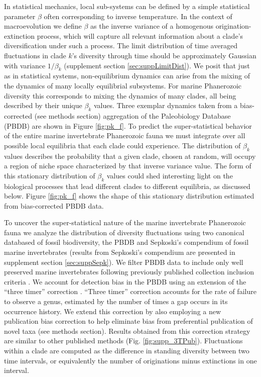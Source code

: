 In statistical mechanics, local sub-systems can be defined by a simple
statistical parameter $\beta$ often corresponding to inverse
temperature. In the context of macroevolution we define $\beta$ as the
inverse variance of a homogenous origination-extinction process, which
will capture all relevant information about a clade's diversification
under such a process.  The limit distribution of time averaged
fluctuations in clade $k$'s diversity through time should be
approximately Gaussian with variance $1/\beta_k$ (supplement section
\ref{sec:suppLimitDist}). We posit that just as in statistical
systems, non-equilibrium dynamics can arise from the mixing of the
dynamics of many locally equilibrial subsystems. For marine
Phanerozoic diversity this corresponds to mixing the dynamics of many
clades, all being described by their unique $\beta_k$ values.  Three
exemplar dynamics taken from a bias-corrected (see methods section)
aggregation of the Paleobiology Database (PBDB) \citep{alroy08} are
shown in Figure \ref{fig:pk_f}.
To predict the super-statistical behavior of the entire marine
invertebrate Phanerozoic fauna we must integrate over all possible
local equilibria that each clade could experience. The distribution of
$\beta_k$ values describes the probability that a given clade, chosen
at random, will occupy a region of niche space characterized by that
inverse variance value. The form of this stationary distribution of
$\beta_k$ values could shed interesting light on the biological
processes that lead different clades to different equilibria, as
discussed below.  Figure \ref{fig:pk_f} shows the shape of this
stationary distribution estimated from bias-corrected PBDB
\citep{alroy08} data.

To uncover the super-statistical nature of the marine invertebrate
Phanerozoic fauna we analyze the distribution of diversity
fluctuations using two canonical databased of fossil biodiversity, the
PBDB \citep{alroy08} and Sepkoski's compendium \citep{sepkoski1992} of
fossil marine invertebrates (results from Sepkoski's compendium are
presented in supplement section \ref{sec:suppSepk}).  We filter PBDB
data to include only well preserved marine invertebrates following
previously published collection inclusion criteria \citep{alroy08,
  alroy2010}.  We account for detection bias in the PBDB using an
extension of the ``three timer'' correction \citep{alroy08}. ``Three
timer'' correction accounts for the rate of failure to observe a
genus, estimated by the number of times a gap occurs in its occurrence
history. We extend this correction by also employing a new publication
bias correction to help eliminate bias from preferential publication
of novel taxa (see methods section). Results obtained from this
correction strategy are similar to other published methods
(Fig. \ref{fig:supp_3TPub}). Fluctuations within a clade are computed
as the difference in standing diversity between two time intervals, or
equivalently the number of originations minus extinctions in one
interval.

